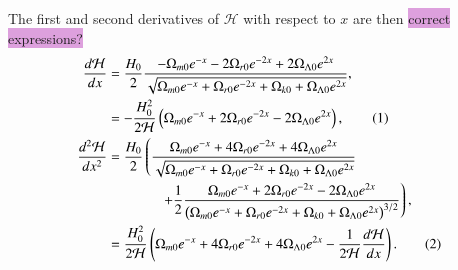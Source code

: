 \documentclass{aa}
\newcommand\numberthis{\addtocounter{equation}{1}\tag{\theequation}}
\begin{document}
The first and second derivatives of $\mathcal{H}$ with respect to $x$ are then \colorbox{Plum}{correct expressions?}
\begin{align*}
  \frac{d\mathcal{H}}{dx} &= \frac{H_0}{2}
  \frac{-\Omega_{m0}e^{-x} - 2\Omega_{r0}e^{-2x} + 2\Omega_{\Lambda0}e^{2x}}
  {\sqrt{\Omega_{m0}e^{-x} 
  + \Omega_{r0}e^{-2x}
  + \Omega_{k0} + \Omega_{\Lambda0}e^{2x}}},
  \\
  &= -\frac{H_0^2}{2\mathcal{H}}\left(\Omega_{m0}e^{-x} + 2\Omega_{r0}e^{-2x} - 2\Omega_{\Lambda0}e^{2x}\right), \numberthis
  \\
  \frac{d^2\mathcal{H}}{dx^2} &= \frac{H_0}{2}
  \left(\frac{\Omega_{m0}e^{-x} + 4\Omega_{r0}e^{-2x} + 4\Omega_{\Lambda0}e^{2x}}{\sqrt{\Omega_{m0}e^{-x} + \Omega_{r0}e^{-2x} + \Omega_{k0} + \Omega_{\Lambda0}e^{2x}}}\right.
  \\
  &\hspace{38pt}
  \left.+ \frac{1}{2}\frac{\Omega_{m0}e^{-x} + 2\Omega_{r0}e^{-2x} - 2\Omega_{\Lambda0}e^{2x}}{\left(\Omega_{m0}e^{-x} + \Omega_{r0}e^{-2x} + \Omega_{k0} + \Omega_{\Lambda0}e^{2x}\right)^{3/2}}\right),
  \\
  &= \frac{H_0^2}{2\mathcal{H}}\left(\Omega_{m0}e^{-x} + 4\Omega_{r0}e^{-2x} + 4\Omega_{\Lambda0}e^{2x}- \frac{1}{2\mathcal{H}}\frac{d\mathcal{H}}{dx}\right). \numberthis
\end{align*}
\end{document}
